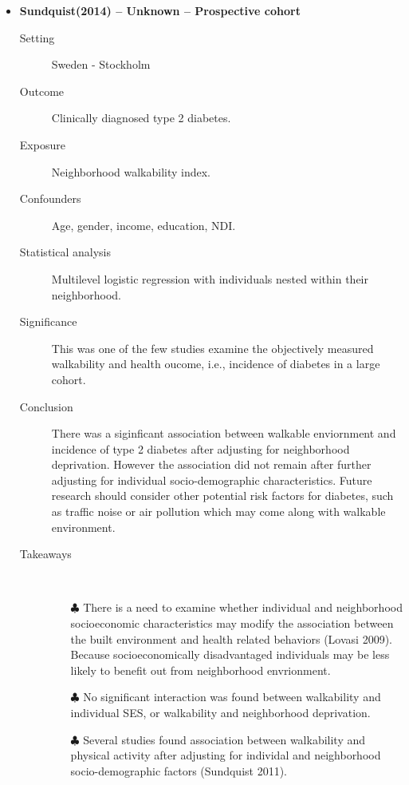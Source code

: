 \documentclass{article}
\begin{document}
\begin{itemize}
\newpage
\item{\bf Sundquist(2014) -- Unknown  -- Prospective cohort} 
		\begin{description}
			\item[Setting] Sweden - Stockholm 
			\item[Outcome] Clinically diagnosed type 2 diabetes.
			\item[Exposure] Neighborhood walkability index.  
			\item[Confounders] Age, gender, income, education, NDI. 
			\item[Statistical analysis] Multilevel logistic regression with individuals nested within their neighborhood. 
			\item[Significance] This was one of the few studies examine the objectively measured walkability and health oucome, i.e., incidence of diabetes in a large cohort. 
			\item[Conclusion] There was a siginficant association between walkable enviornment and incidence of type 2 diabetes after adjusting for neighborhood deprivation. However the association did not remain after further adjusting for individual socio-demographic characteristics. Future research should consider other potential risk factors for diabetes, such as traffic noise or air pollution which may come along with walkable environment. 
			\item[Takeaways] \mbox{}\\
				\begin{itemize}
					\item[$\clubsuit$] There is a need to examine whether individual and neighborhood socioeconomic characteristics may modify the association between the built environment and health related behaviors (Lovasi 2009). Because socioeconomically disadvantaged individuals may be less likely to benefit out from neighborhood envrionment. 
					\item[$\clubsuit$] No significant interaction was found between walkability and individual SES, or walkability and neighborhood deprivation.
					\item[$\clubsuit$] Several studies found association between walkability and physical activity after adjusting for individal and neighborhood socio-demographic factors (Sundquist 2011). 
				\end{itemize} 
			
		\end{description}


\end{itemize}
\end{document}
